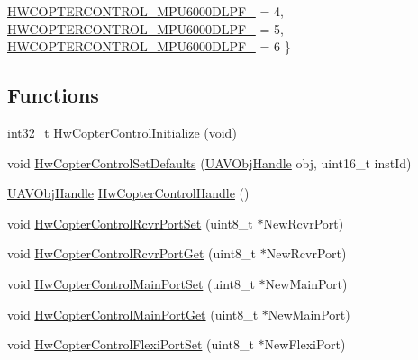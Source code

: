\begin{DoxyCompactItemize}
\*
\hyperlink{group___hw_copter_control_gga123c80ab111d7e71fa855f92e7cc1431a9adea79066f76b53480ed237dc92f08b}{\-H\-W\-C\-O\-P\-T\-E\-R\-C\-O\-N\-T\-R\-O\-L\-\_\-\-M\-P\-U6000\-D\-L\-P\-F\-\_} = 4, 
\hyperlink{group___hw_copter_control_gga123c80ab111d7e71fa855f92e7cc1431a2f447912fedee23998e5b44ad27f7b76}{\-H\-W\-C\-O\-P\-T\-E\-R\-C\-O\-N\-T\-R\-O\-L\-\_\-\-M\-P\-U6000\-D\-L\-P\-F\-\_} = 5, 
\hyperlink{group___hw_copter_control_gga123c80ab111d7e71fa855f92e7cc1431aef08c99bc3f2474c14124315d76ade73}{\-H\-W\-C\-O\-P\-T\-E\-R\-C\-O\-N\-T\-R\-O\-L\-\_\-\-M\-P\-U6000\-D\-L\-P\-F\-\_} = 6
 \}
\end{DoxyCompactItemize}
\subsection*{\-Functions}
\begin{DoxyCompactItemize}
\item 
int32\-\_\-t \hyperlink{group___hw_copter_control_ga5b1a25e7caa430e479fad08909694433}{\-Hw\-Copter\-Control\-Initialize} (void)
\item 
void \hyperlink{group___hw_copter_control_gae3f624a5246fcd35a882f0ff0e8a0de2}{\-Hw\-Copter\-Control\-Set\-Defaults} (\hyperlink{targets_2_u_a_v_objects_2inc_2uavobjectmanager_8h_a279053e22be53ce9f895043aaeb91e3b}{\-U\-A\-V\-Obj\-Handle} obj, uint16\-\_\-t inst\-Id)
\item 
\hyperlink{targets_2_u_a_v_objects_2inc_2uavobjectmanager_8h_a279053e22be53ce9f895043aaeb91e3b}{\-U\-A\-V\-Obj\-Handle} \hyperlink{group___hw_copter_control_gaad7687d36291c7057dfd225e8d31109f}{\-Hw\-Copter\-Control\-Handle} ()
\item 
void \hyperlink{group___hw_copter_control_gad0b7d8c6dd12d99c2b997b5fdba0a866}{\-Hw\-Copter\-Control\-Rcvr\-Port\-Set} (uint8\-\_\-t $\ast$\-New\-Rcvr\-Port)
\item 
void \hyperlink{group___hw_copter_control_ga3fbb99f5441e4e35c590675c9371838a}{\-Hw\-Copter\-Control\-Rcvr\-Port\-Get} (uint8\-\_\-t $\ast$\-New\-Rcvr\-Port)
\item 
void \hyperlink{group___hw_copter_control_ga6fa0ae21d42e7f94a2d126f214ed5eed}{\-Hw\-Copter\-Control\-Main\-Port\-Set} (uint8\-\_\-t $\ast$\-New\-Main\-Port)
\item 
void \hyperlink{group___hw_copter_control_ga988c65aeca8df66ce948a8c48afc7854}{\-Hw\-Copter\-Control\-Main\-Port\-Get} (uint8\-\_\-t $\ast$\-New\-Main\-Port)
\item 
void \hyperlink{group___hw_copter_control_ga5678455e5c31b1b8ff464fa59b994dd9}{\-Hw\-Copter\-Control\-Flexi\-Port\-Set} (uint8\-\_\-t $\ast$\-New\-Flexi\-Port)

\end{DoxyCompactItemize}
